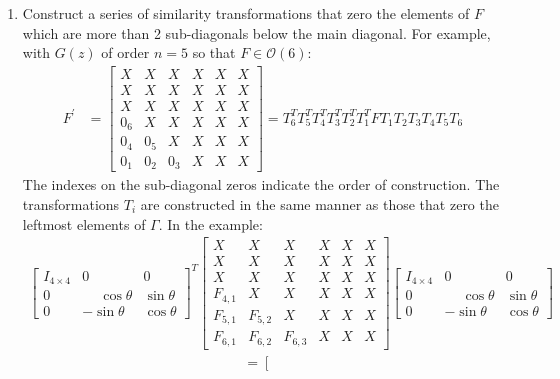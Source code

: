 \documentclass[a4paper,twoside,10pt,english]{report}
\begin{document}
\begin{enumerate}
\item Construct a series of similarity transformations that zero the elements
of $F$ which are more than 2 sub-diagonals below the main diagonal.
For example, with $G\left(z\right)$ of order $n=5$ so that 
$F \in \mathcal{O}\left(6\right)$:
\begin{align*}
F^{\prime} &= \left[\begin{array}{cccccc}
X & X & X & X & X & X\\
X & X & X & X & X & X\\
X & X & X & X & X & X\\
0_{6} & X & X & X & X & X\\
0_{4} & 0_{5} & X & X & X & X\\
0_{1} & 0_{2} & 0_{3} & X & X & X
\end{array}\right]=T_{6}^{T}T_{5}^{T}T_{4}^{T}T_{3}^{T}T_{2}^{T}T_{1}^{T}FT_{1}T_{2}T_{3}T_{4}T_{5}T_{6}
\end{align*}
The indexes on the sub-diagonal zeros indicate the order of construction. The
transformations $T_{i}$ are constructed in the same manner as those that zero
the leftmost elements of $\Gamma$. In the example:
\begin{align*}
\left[\begin{array}{ccc}
I_{4\times4} & 0 & 0 \\
0 & \phantom{-}\cos\theta & \sin\theta \\
0 &           -\sin\theta & \cos\theta 
\end{array}\right]^{T}
\left[\begin{array}{cccccc}
X & X & X & X & X & X\\
X & X & X & X & X & X\\
X & X & X & X & X & X\\
F_{4,1} & X & X & X & X & X\\
F_{5,1} & F_{5,2} & X & X & X & X\\
F_{6,1} & F_{6,2} & F_{6,3} & X & X & X
\end{array}\right]\left[\begin{array}{ccc}
I_{4\times4} & 0 & 0 \\
0 & \phantom{-}\cos\theta & \sin\theta \\
0 &           -\sin\theta & \cos\theta  
\end{array}\right]
\end{align*}
\begin{align*}
=  \left[\begin{array}{cccccc}

\end{array}
\end{align*}
\end{enumerate}
\end{document}
